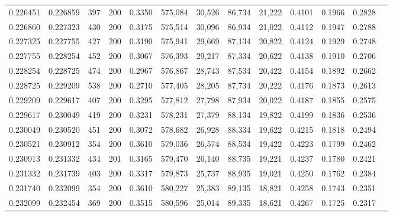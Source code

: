 \begin{tabular}{rrrrrrrrrrrrr}
0.226451 & 0.226859 &    397 & 200 &                                     0.3350 & 575,084 &  30,526 &  86,734 &  21,222 & 0.4101 & 0.1966 & 0.2828 \\
0.226860 & 0.227323 &    430 & 200 &                                     0.3175 & 575,514 &  30,096 &  86,934 &  21,022 & 0.4112 & 0.1947 & 0.2788 \\
0.227325 & 0.227755 &    427 & 200 &                                     0.3190 & 575,941 &  29,669 &  87,134 &  20,822 & 0.4124 & 0.1929 & 0.2748 \\
0.227755 & 0.228254 &    452 & 200 &                                     0.3067 & 576,393 &  29,217 &  87,334 &  20,622 & 0.4138 & 0.1910 & 0.2706 \\
0.228254 & 0.228725 &    474 & 200 &                                     0.2967 & 576,867 &  28,743 &  87,534 &  20,422 & 0.4154 & 0.1892 & 0.2662 \\
0.228725 & 0.229209 &    538 & 200 &                                     0.2710 & 577,405 &  28,205 &  87,734 &  20,222 & 0.4176 & 0.1873 & 0.2613 \\
0.229209 & 0.229617 &    407 & 200 &                                     0.3295 & 577,812 &  27,798 &  87,934 &  20,022 & 0.4187 & 0.1855 & 0.2575 \\
0.229617 & 0.230049 &    419 & 200 &                                     0.3231 & 578,231 &  27,379 &  88,134 &  19,822 & 0.4199 & 0.1836 & 0.2536 \\
0.230049 & 0.230520 &    451 & 200 &                                     0.3072 & 578,682 &  26,928 &  88,334 &  19,622 & 0.4215 & 0.1818 & 0.2494 \\
0.230521 & 0.230912 &    354 & 200 &                                     0.3610 & 579,036 &  26,574 &  88,534 &  19,422 & 0.4223 & 0.1799 & 0.2462 \\
0.230913 & 0.231332 &    434 & 201 &                                     0.3165 & 579,470 &  26,140 &  88,735 &  19,221 & 0.4237 & 0.1780 & 0.2421 \\
0.231332 & 0.231739 &    403 & 200 &                                     0.3317 & 579,873 &  25,737 &  88,935 &  19,021 & 0.4250 & 0.1762 & 0.2384 \\
0.231740 & 0.232099 &    354 & 200 &                                     0.3610 & 580,227 &  25,383 &  89,135 &  18,821 & 0.4258 & 0.1743 & 0.2351 \\
0.232099 & 0.232454 &    369 & 200 &                                     0.3515 & 580,596 &  25,014 &  89,335 &  18,621 & 0.4267 & 0.1725 & 0.2317 \\

\end{tabular}

